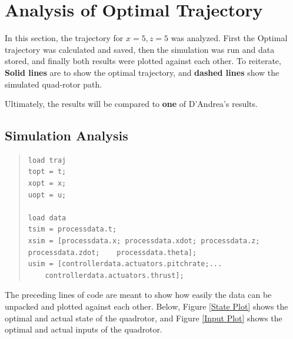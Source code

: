 \documentclass[12pt]{article}
\begin{document}
\section{Analysis of Optimal Trajectory}

In this section, the trajectory for $x=5,z=5$ was analyzed. First the Optimal trajectory was calculated and saved, then the simulation was run and data stored, and finally both results were plotted against each other. To reiterate, \textbf{Solid lines} are to show the optimal trajectory, and \textbf{dashed lines} show the simulated quad-rotor path.

Ultimately, the results will be compared to \textbf{one} of D'Andrea's results\cite{D'Andrea}. 

\subsection{Simulation Analysis}
\begin{quote}
\begin{lstlisting}
load traj
topt = t;
xopt = x;
uopt = u;

load data
tsim = processdata.t;
xsim = [processdata.x; processdata.xdot; processdata.z; processdata.zdot;    processdata.theta];
usim = [controllerdata.actuators.pitchrate;...
	controllerdata.actuators.thrust];
\end{lstlisting}
\end{quote}
The preceding lines of code are meant to show how easily the data can be unpacked and plotted against each other. Below, Figure \ref{State Plot} shows the optimal and actual state of the quadrotor, and Figure \ref{Input Plot} shows the optimal and actual inputs of the quadrotor.
\end{document}
